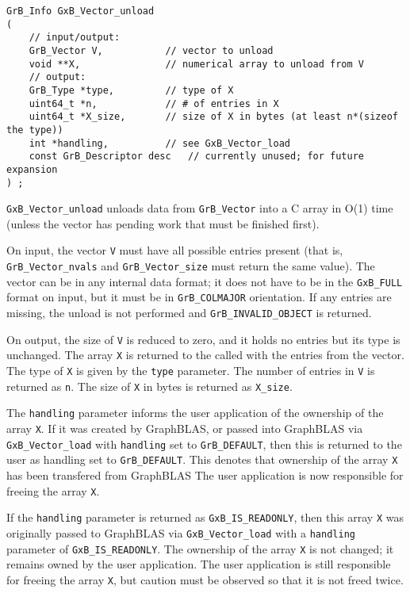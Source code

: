 \begin{mdframed}[userdefinedwidth=6in]
{\footnotesize
\begin{verbatim}
GrB_Info GxB_Vector_unload
(
    // input/output:
    GrB_Vector V,           // vector to unload
    void **X,               // numerical array to unload from V
    // output:
    GrB_Type *type,         // type of X
    uint64_t *n,            // # of entries in X
    uint64_t *X_size,       // size of X in bytes (at least n*(sizeof the type))
    int *handling,          // see GxB_Vector_load
    const GrB_Descriptor desc   // currently unused; for future expansion
) ;
\end{verbatim}
} \end{mdframed}

\verb'GxB_Vector_unload' unloads data from \verb'GrB_Vector' into a C array in
O(1) time (unless the vector has pending work that must be finished first).

On input, the vector \verb'V' must have all possible entries present (that is,
\verb'GrB_Vector_nvals' and \verb'GrB_Vector_size' must return the same value).
The vector can be in any internal data format; it does not have to be in the
\verb'GxB_FULL' format on input, but it must be in \verb'GrB_COLMAJOR'
orientation.  If any entries are missing, the unload is not performed and
\verb'GrB_INVALID_OBJECT' is returned.

On output, the size of \verb'V' is reduced to zero, and it holds no entries but
its type is unchanged.  The array \verb'X' is returned to the called with the
entries from the vector.  The type of \verb'X' is given by the \verb'type'
parameter.  The number of entries in \verb'V' is returned as \verb'n'.
The size of \verb'X' in bytes is returned as \verb'X_size'.

The \verb'handling' parameter informs the user application of the ownership of
the array \verb'X'.  If it was created by GraphBLAS, or passed into GraphBLAS
via \verb'GxB_Vector_load' with \verb'handling' set to \verb'GrB_DEFAULT', then
this is returned to the user as handling set to \verb'GrB_DEFAULT'.  This
denotes that ownership of the array \verb'X' has been transfered from GraphBLAS
The user application is now responsible for freeing the array \verb'X'.

If the \verb'handling' parameter is returned as \verb'GxB_IS_READONLY', then
this array \verb'X' was originally passed to GraphBLAS via
\verb'GxB_Vector_load' with a \verb'handling' parameter of
\verb'GxB_IS_READONLY'.  The ownership of the array \verb'X' is not changed; it
remains owned by the user application.  The user application is still
responsible for freeing the array \verb'X', but caution must be observed so
that it is not freed twice.

